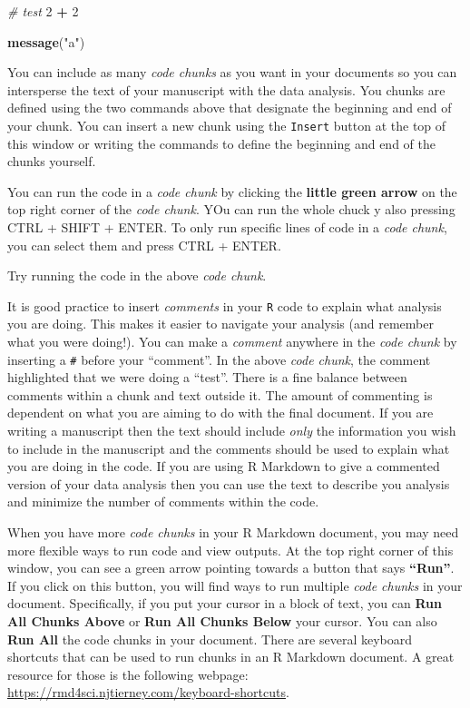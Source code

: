 \documentclass[
]{article}
\newenvironment{Shaded}{\begin{snugshade}}{\end{snugshade}}
\newcommand{\CommentTok}[1]{\textcolor[rgb]{0.56,0.35,0.01}{\textit{#1}}}
\newcommand{\DecValTok}[1]{\textcolor[rgb]{0.00,0.00,0.81}{#1}}
\newcommand{\KeywordTok}[1]{\textcolor[rgb]{0.13,0.29,0.53}{\textbf{#1}}}
\newcommand{\NormalTok}[1]{#1}
\newcommand{\OperatorTok}[1]{\textcolor[rgb]{0.81,0.36,0.00}{\textbf{#1}}}
\newcommand{\StringTok}[1]{\textcolor[rgb]{0.31,0.60,0.02}{#1}}
\begin{document}
\begin{Shaded}
\begin{Highlighting}[]
\CommentTok{# test}
\DecValTok{2} \OperatorTok{+}\StringTok{ }\DecValTok{2}

\KeywordTok{message}\NormalTok{(}\StringTok{"a"}\NormalTok{)}
\end{Highlighting}
\end{Shaded}

You can include as many \emph{code chunks} as you want in your documents
so you can intersperse the text of your manuscript with the data
analysis. You chunks are defined using the two commands above that
designate the beginning and end of your chunk. You can insert a new
chunk using the \texttt{Insert} button at the top of this window or
writing the commands to define the beginning and end of the chunks
yourself.

You can run the code in a \emph{code chunk} by clicking the
\textbf{little green arrow} on the top right corner of the \emph{code
chunk}. YOu can run the whole chuck y also pressing CTRL + SHIFT +
ENTER. To only run specific lines of code in a \emph{code chunk}, you
can select them and press CTRL + ENTER.

Try running the code in the above \emph{code chunk}.

It is good practice to insert \emph{comments} in your \texttt{R} code to
explain what analysis you are doing. This makes it easier to navigate
your analysis (and remember what you were doing!). You can make a
\emph{comment} anywhere in the \emph{code chunk} by inserting a
\texttt{\#} before your ``comment''. In the above \emph{code chunk}, the
comment highlighted that we were doing a ``test''. There is a fine
balance between comments within a chunk and text outside it. The amount
of commenting is dependent on what you are aiming to do with the final
document. If you are writing a manuscript then the text should include
\emph{only} the information you wish to include in the manuscript and
the comments should be used to explain what you are doing in the code.
If you are using R Markdown to give a commented version of your data
analysis then you can use the text to describe you analysis and minimize
the number of comments within the code.

When you have more \emph{code chunks} in your R Markdown document, you
may need more flexible ways to run code and view outputs. At the top
right corner of this window, you can see a green arrow pointing towards
a button that says \textbf{``Run''}. If you click on this button, you
will find ways to run multiple \emph{code chunks} in your document.
Specifically, if you put your cursor in a block of text, you can
\textbf{Run All Chunks Above} or \textbf{Run All Chunks Below} your
cursor. You can also \textbf{Run All} the code chunks in your document.
There are several keyboard shortcuts that can be used to run chunks in
an R Markdown document. A great resource for those is the following
webpage: \url{https://rmd4sci.njtierney.com/keyboard-shortcuts}.
\end{document}
